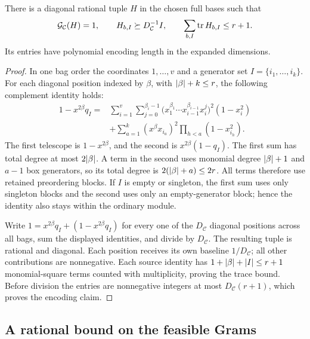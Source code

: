 \begin{lemma}\label{lem:rat-interior}
There is a diagonal rational tuple $H$ in the chosen full bases such that
\begin{equation}\label{eq:rat-interior}
 \mathcal G_{\mathcal C}(H)=1,\qquad
 H_{b,I}\succeq D_{\mathcal C}^{-1}I,\qquad
 \sum_{b,I}\operatorname{tr} H_{b,I}\le r+1.
\end{equation}
Its entries have polynomial encoding length in the expanded dimensions.
\end{lemma}
\begin{proof}
In one bag order the coordinates $1,\dots,v$ and a generator set
$I=\{i_1,\dots,i_k\}$. For each diagonal position indexed by $\beta$,
with $\lvert \beta\rvert+k\le r$, the following complement identity holds:
\begin{align}
 1-x^{2\beta}q_I
 ={}&\sum_{i=1}^{v}\sum_{j=0}^{\beta_i-1}
 \bigl(x_1^{\beta_1}\cdots x_{i-1}^{\beta_{i-1}}x_i^j\bigr)^2
 (1-x_i^2) \label{eq:rat-complement}\\
 &+\sum_{a=1}^{k}(x^\beta x_{i_a})^2
           \prod_{h<a}(1-x_{i_h}^2).\nonumber
\end{align}
The first telescope is $1-x^{2\beta}$, and the second is
$x^{2\beta}(1-q_I)$. The first sum has total degree at most
$2\lvert \beta\rvert$. A term in the second uses monomial degree
$\lvert \beta\rvert+1$ and $a-1$ box generators, so its total degree is
$2(\lvert \beta\rvert+a)\le2r$. All terms therefore use retained preordering
blocks. If $I$ is empty or singleton, the first sum uses only singleton
blocks and the second uses only an empty-generator block; hence the
identity also stays within the ordinary module.

Write $1=x^{2\beta}q_I+(1-x^{2\beta}q_I)$ for every one of the
$D_{\mathcal C}$ diagonal positions across all bags, sum the displayed
identities, and divide by $D_{\mathcal C}$. The resulting tuple is
rational and diagonal. Each position receives its own baseline
$1/D_{\mathcal C}$; all other contributions are nonnegative. Each source
identity has $1+\lvert \beta\rvert+\lvert I\rvert\le r+1$ monomial-square terms counted
with multiplicity, proving the trace bound. Before division the entries
are nonnegative integers at most $D_{\mathcal C}(r+1)$, which proves the
encoding claim.
\end{proof}

\subsection{A rational bound on the feasible Grams}\label{sec:rat-outer}

